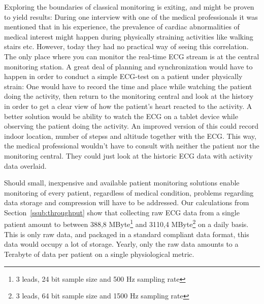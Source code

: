 Exploring the boundaries of classical monitoring is exiting, and might be proven to yield results: During one interview with one of the medical professionals it was mentioned that in his experience, the prevalence of cardiac abnormalities of medical interest might happen during physically straining activities like walking stairs etc. However, today they had no practical way of seeing this correlation. The only place where you can monitor the real-time ECG stream is at the central monitoring station. A great deal of planning and synchronization would have to happen in order to conduct a simple ECG-test on a patient under physically strain: One would have to record the time and place while watching the patient doing the activity, then return to the monitoring central and look at the history in order to get a clear view of how the patient's heart reacted to the activity. A better solution would be ability to watch the ECG on a tablet device while observing the patient doing the activity. An improved version of this could record indoor location, number of stepss and altitude together with the ECG. This way, the medical professional wouldn't have to consult with neither the patient nor the monitoring central. They could just look at the historic ECG data with activity data overlaid.

Should small, inexpensive and available patient monitoring solutions enable monitoring of every patient, regardless of medical condition, problems regarding data storage and compression will have to be addressed. Our calculations from Section~\ref{ssub:throughput} show that collecting raw ECG data from a single patient amount to between 388,8 MByte\footnote{3 leads, 24 bit sample size and 500 Hz sampling rate} and 3110,4 MByte\footnote{3 leads, 64 bit sample size and 1500 Hz sampling rate} on a daily basis. This is only raw data, and packaged in a standard compliant data format, this data would occupy a lot of storage. Yearly, only the raw data amounts to a Terabyte of data per patient on a single physiological metric.


